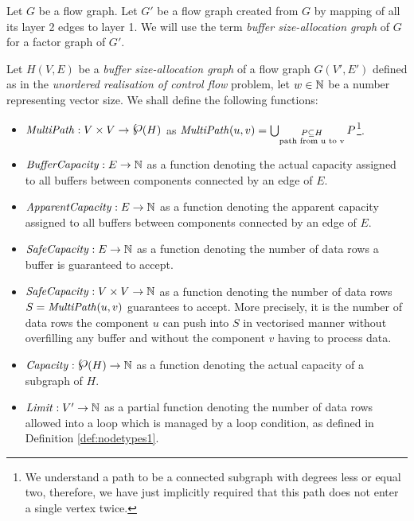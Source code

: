   Let $G$ be a flow graph. Let $G'$ be a flow graph created from $G$ by mapping of all its layer 2 edges to layer 1.
      We will use the term \emph{buffer size-allocation graph} of $G$ for a factor graph of $G'$.
\myenddef


      Let $H(V,E)$ be a \emph{buffer size-allocation graph} of a flow graph $G(V',E')$ defined as in the \emph{unordered realisation of control flow} problem, let $w \in \mathbb{N}$ be a number representing vector size. We shall define the following functions:
  \begin{itemize}
    \item $\mf{multiPath}: V \times V \arrow \powerset (H)$ as $\mf{multiPath}(u,v) = \bigcup_{\substack{P \subseteq H \\ \text{path from u to v}}} P$\footnote{We understand a path to be a connected subgraph with degrees less or equal two, therefore, we have just implicitly required that this path does not enter a single vertex twice.}.
    \item $\mf{bufferCapacity}: E \arrow \N$ as a function denoting the actual capacity assigned to all buffers between components connected by an edge of $E$.
    \item $\mf{apparentCapacity}: E \arrow \N$ as a function denoting the apparent capacity assigned to all buffers between components connected by an edge of $E$.
    \item $\mf{safeCapacity}: E \arrow \N$ as a function denoting the number of data rows a buffer is guaranteed to accept.
    \item $\mf{safeCapacity}: V \times V \arrow \N$ as a function denoting the number of data rows $S = \mf{multiPath}(u,v)$ guarantees to accept. More precisely, it is the number of data rows the component $u$ can push into $S$ in vectorised manner without overfilling any buffer and without the component $v$ having to process data. 
    \item $\mf{capacity}: \powerset(H) \arrow \N$ as a function denoting the actual capacity of a subgraph of $H$.
    \item $\mf{limit}: V' \arrow \N$ as a partial function denoting the number of data rows allowed into a loop which is managed by a loop condition, as defined in Definition \ref{def:nodetypes1}.
  \end{itemize}


